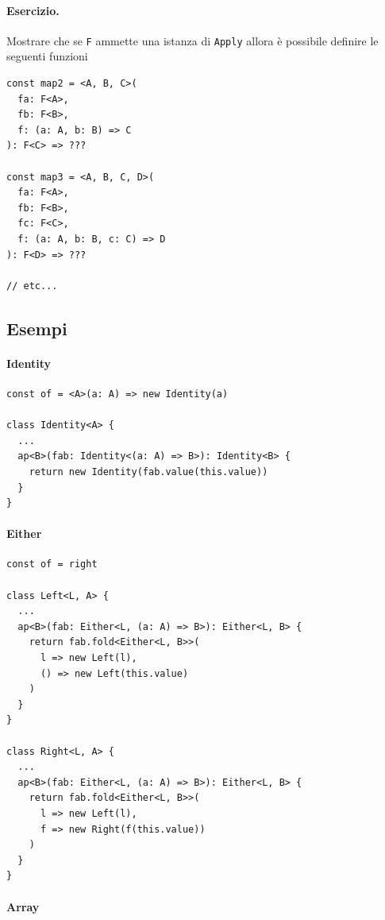 \documentclass[12pt]{article}
\begin{document}
\paragraph{Esercizio. } Mostrare che se \texttt{F} ammette una istanza di \texttt{Apply} allora è possibile definire le seguenti funzioni

\begin{verbatim}
const map2 = <A, B, C>(
  fa: F<A>,
  fb: F<B>,
  f: (a: A, b: B) => C
): F<C> => ???

const map3 = <A, B, C, D>(
  fa: F<A>,
  fb: F<B>,
  fc: F<C>,
  f: (a: A, b: B, c: C) => D
): F<D> => ???

// etc...
\end{verbatim}

\subsection{Esempi}

\paragraph{Identity}

\begin{verbatim}
const of = <A>(a: A) => new Identity(a)

class Identity<A> {
  ...
  ap<B>(fab: Identity<(a: A) => B>): Identity<B> {
    return new Identity(fab.value(this.value))
  }
}
\end{verbatim}

\paragraph{Either}

\begin{verbatim}
const of = right

class Left<L, A> {
  ...
  ap<B>(fab: Either<L, (a: A) => B>): Either<L, B> {
    return fab.fold<Either<L, B>>(
      l => new Left(l),
      () => new Left(this.value)
    )
  }
}

class Right<L, A> {
  ...
  ap<B>(fab: Either<L, (a: A) => B>): Either<L, B> {
    return fab.fold<Either<L, B>>(
      l => new Left(l),
      f => new Right(f(this.value))
    )
  }
}
\end{verbatim}

\paragraph{Array}
\end{document}
